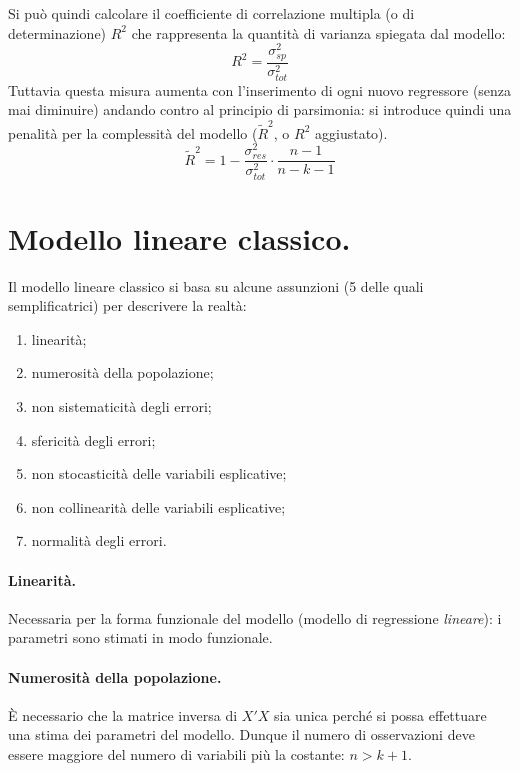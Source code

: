 \documentclass[11pt]{article}
\begin{document}
Si può quindi calcolare il coefficiente di correlazione multipla (o di determinazione) $R^2$ che rappresenta la quantità di varianza spiegata dal modello:
\begin{equation*}
  R^2 = \frac{\sigma^2_{sp}}{\sigma^2_{tot}}
\end{equation*}
Tuttavia questa misura aumenta con l'inserimento di ogni nuovo regressore (senza mai diminuire) andando contro al principio di parsimonia: si introduce quindi una penalità per la complessità del modello ($\tilde{R}^2$, o $R^2$ aggiustato).
\begin{equation*}
  \tilde{R}^2 = 1 - \frac{\sigma^2_{res}}{\sigma^2_{tot}} \cdot \frac{n-1}{n-k-1}
\end{equation*}

\section{Modello lineare classico.}
Il modello lineare classico si basa su alcune assunzioni (5 delle quali semplificatrici) per descrivere la realtà:
\begin{enumerate}
  \item linearità;
  \item numerosità della popolazione;
  \item non sistematicità degli errori;
  \item sfericità degli errori;
  \item non stocasticità delle variabili esplicative;
  \item non collinearità delle variabili esplicative;
  \item normalità degli errori.
\end{enumerate}

\paragraph{Linearità.}
Necessaria per la forma funzionale del modello (modello di regressione \textit{lineare}): i parametri sono stimati in modo funzionale.

\paragraph{Numerosità della popolazione.}
È necessario che la matrice inversa di $X'X$ sia unica perché si possa effettuare una stima dei parametri del modello.
Dunque il numero di osservazioni deve essere maggiore del numero di variabili più la costante: $n > k+1$.
\end{document}
